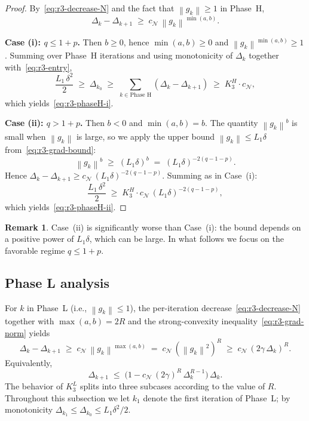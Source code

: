 \documentclass[11pt,a4paper]{article}
\theoremstyle{plain}
\theoremstyle{definition}
\newtheorem{remark}{Remark}
\newcommand{\norm}[1]{\left\|#1\right\|}
\newcommand{\Lone}{L_{1}}
\newcommand{\setN}{\mathcal{N}}
\newcommand{\cN}{c_{\setN}}
\begin{document}
\begin{proof}
By~\eqref{eq:r3-decrease-N} and the fact that $\norm{g_{k}} \geq 1$ in Phase~H,
\[
\Delta_{k} - \Delta_{k+1} \;\geq\; \cN\,\norm{g_{k}}^{\min(a,b)}.
\]

\textbf{Case (i): $q \leq 1+p$.} Then $b \geq 0$, hence $\min(a,b) \geq 0$ and $\norm{g_{k}}^{\min(a,b)} \geq 1$. Summing over Phase~H iterations and using monotonicity of $\Delta_{k}$ together with~\eqref{eq:r3-entry},
\[
\frac{\Lone\,\delta^{2}}{2} \;\geq\; \Delta_{k_{0}} \;\geq\; \sum_{k \in \text{Phase H}}(\Delta_{k} - \Delta_{k+1}) \;\geq\; K_{3}^{H}\cdot\cN,
\]
which yields~\eqref{eq:r3-phaseH-i}.

\textbf{Case (ii): $q > 1+p$.} Then $b < 0$ and $\min(a,b) = b$. The quantity $\norm{g_{k}}^{b}$ is small when $\norm{g_{k}}$ is large, so we apply the upper bound $\norm{g_{k}} \leq \Lone\delta$ from~\eqref{eq:r3-grad-bound}:
\[
\norm{g_{k}}^{b} \;\geq\; (\Lone\delta)^{b} \;=\; (\Lone\delta)^{-2(q-1-p)}.
\]
Hence $\Delta_{k} - \Delta_{k+1} \geq \cN\,(\Lone\delta)^{-2(q-1-p)}$. Summing as in Case~(i):
\[
\frac{\Lone\,\delta^{2}}{2} \;\geq\; K_{3}^{H}\cdot\cN\,(\Lone\delta)^{-2(q-1-p)},
\]
which yields~\eqref{eq:r3-phaseH-ii}.
\end{proof}

\begin{remark}\label{rem:r3-phaseH-cases}
Case~(ii) is significantly worse than Case~(i): the bound depends on a positive power of $\Lone\delta$, which can be large. In what follows we focus on the favorable regime $q \leq 1+p$.
\end{remark}

\subsection{Phase L analysis}\label{subsec:r3-phaseL}

For $k$ in Phase~L (i.e., $\norm{g_{k}} \leq 1$), the per-iteration decrease~\eqref{eq:r3-decrease-N} together with $\max(a,b) = 2R$ and the strong-convexity inequality~\eqref{eq:r3-grad-norm} yields
\[
\Delta_{k} - \Delta_{k+1} \;\geq\; \cN\,\norm{g_{k}}^{\max(a,b)} \;=\; \cN\,(\norm{g_{k}}^{2})^{R} \;\geq\; \cN\,(2\gamma\,\Delta_{k})^{R}.
\]
Equivalently,
\begin{equation}\label{eq:r3-phaseL-recurrence}
\Delta_{k+1} \;\leq\; \bigl(1 - \cN\,(2\gamma)^{R}\,\Delta_{k}^{R-1}\bigr)\,\Delta_{k}.
\end{equation}
The behavior of $K_{3}^{L}$ splits into three subcases according to the value of $R$. Throughout this subsection we let $k_{1}$ denote the first iteration of Phase~L; by monotonicity $\Delta_{k_{1}} \leq \Delta_{k_{0}} \leq \Lone\delta^{2}/2$.
\end{document}
